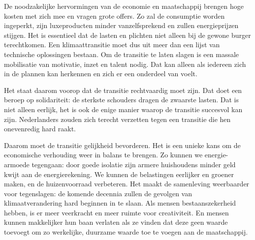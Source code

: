 
De noodzakelijke hervormingen van de economie en maatschappij brengen hoge kosten met zich mee en vragen grote offers. Zo zal de consumptie worden ingeperkt, zijn luxeproducten minder vanzelfsprekend en zullen energieprijzen stijgen. Het is essentieel dat de lasten en plichten niet alleen bij de gewone burger terechtkomen. Een klimaattransitie moet dus uit meer dan een lijst van technische oplossingen bestaan. Om de transitie te laten slagen is een massale mobilisatie van motivatie, inzet en talent nodig. Dat kan alleen als iedereen zich in de plannen kan herkennen en zich er een onderdeel van voelt.

Het staat daarom voorop dat de transitie rechtvaardig moet zijn. Dat doet een beroep op solidariteit: de sterkste schouders dragen de zwaarste lasten. Dat is niet alleen eerlijk, het is ook de enige manier waarop de transitie succesvol kan zijn. Nederlanders zouden zich terecht verzetten tegen een transitie die hen onevenredig hard raakt.

Daarom moet de transitie gelijkheid bevorderen. Het is een unieke kans om de economische verhouding weer in balans te brengen. Zo kunnen we energie-armoede tegengaan: door goede isolatie zijn armere huishoudens minder geld kwijt aan de energierekening. We kunnen de belastingen eerlijker en groener maken, en de huizenvoorraad verbeteren. Het maakt de samenleving weerbaarder voor tegenslagen: de komende decennia zullen de gevolgen van klimaatverandering hard beginnen in te slaan. Als mensen bestaanszekerheid hebben, is er meer veerkracht en meer ruimte voor creativiteit. En mensen kunnen makkelijker hun baan verlaten als ze vinden dat deze geen waarde toevoegt om zo werkelijke, duurzame waarde toe te voegen aan de maatschappij.

